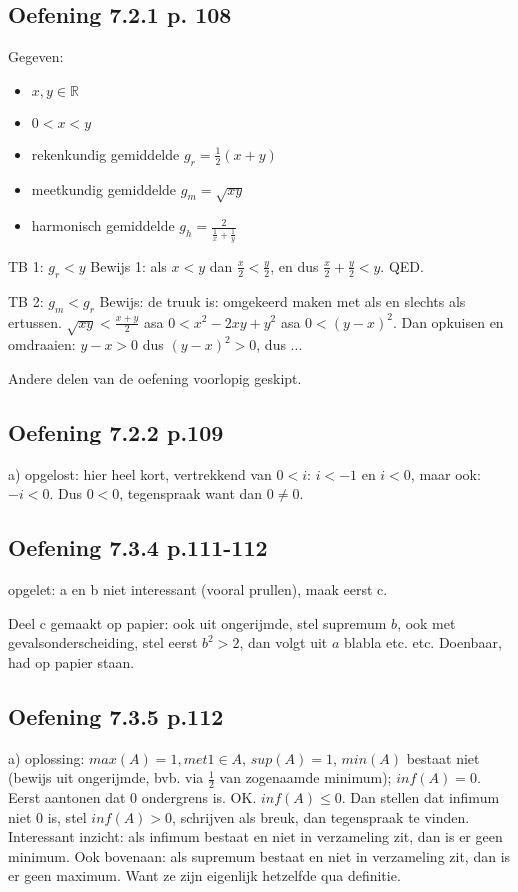 \documentclass{article}
\begin{document}
\subsection*{Oefening 7.2.1 p. 108} 
Gegeven: 
\begin{itemize}
    \item $x,y \in \mathbb{R}$
    \item $0<x<y$
    \item rekenkundig gemiddelde $g_r = \frac{1}{2}(x+y)$
    \item meetkundig gemiddelde $g_m = \sqrt{xy}$
    \item harmonisch gemiddelde $g_h = \frac{2}{\frac{1}{x}+\frac{1}{y}}$
\end{itemize}

TB 1: $g_r < y$
Bewijs 1: als $x<y$ dan $\frac{x}{2} < \frac{y}{2}$, en dus $\frac{x}{2} +\frac{y}{2}< y$. QED. 

TB 2: $g_m < g_r$
Bewijs: de truuk is: omgekeerd maken met als en slechts als ertussen. 
$\sqrt{xy}<\frac{x+y}{2}$ asa $0 < x^2 - 2xy + y^2$ asa $0 < (y-x)^2$. 
Dan opkuisen en omdraaien: $y-x>0$ dus $(y-x)^2>0$, dus ...

Andere delen van de oefening voorlopig geskipt. 


\subsection*{Oefening 7.2.2 p.109}  
a) opgelost: hier heel kort, vertrekkend van $0<i$: $i<-1$ en $i<0$, maar ook: $-i<0$. Dus $0<0$, tegenspraak want dan $0 \neq 0$. 

\subsection*{Oefening 7.3.4 p.111-112} 
opgelet: a en b niet interessant (vooral prullen), maak eerst c. 

Deel c gemaakt op papier: ook uit ongerijmde, stel supremum $b$, ook met gevalsonderscheiding, stel eerst $b^2>2$, dan volgt uit $a$ blabla etc. etc. Doenbaar, had op papier staan.  

\subsection*{Oefening 7.3.5 p.112}

a) oplossing: $max (A)=1, met 1\in A$, $sup( A)=1$, $min(A)$ bestaat niet (bewijs uit ongerijmde, bvb. via $\frac{1}{2}$ van zogenaamde minimum); $inf(A)=0$. Eerst aantonen dat $0$ ondergrens is. OK. $inf(A) \leq 0$. Dan stellen dat infimum niet $0$ is, stel $inf(A)>0 $, schrijven als breuk, dan tegenspraak te vinden. 
Interessant inzicht: als infimum bestaat en niet in verzameling zit, dan is er geen minimum. Ook bovenaan: als supremum bestaat en niet in verzameling zit, dan is er geen maximum. Want ze zijn eigenlijk hetzelfde qua definitie. 
\end{document}

